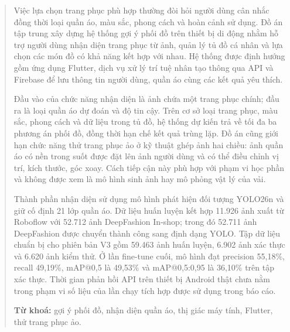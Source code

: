 \begin{abstract}

Việc lựa chọn trang phục phù hợp thường đòi hỏi người dùng cân nhắc đồng
thời loại quần áo, màu sắc, phong cách và hoàn cảnh sử dụng. Đồ án tập trung
xây dựng hệ thống gợi ý phối đồ trên thiết bị di động nhằm hỗ trợ người dùng
nhận diện trang phục từ ảnh, quản lý tủ đồ cá nhân và lựa chọn các món đồ có
khả năng kết hợp với nhau. Hệ thống được định hướng gồm ứng dụng Flutter,
dịch vụ xử lý trí tuệ nhân tạo thông qua API và Firebase để lưu thông tin
người dùng, quần áo cùng các kết quả yêu thích.

Đầu vào của chức năng nhận diện là ảnh chứa một trang phục chính; đầu ra là
loại quần áo dự đoán và độ tin cậy. Trên cơ sở loại trang phục, màu sắc,
phong cách và dữ liệu trong tủ đồ, hệ thống dự kiến trả về tối đa ba phương
án phối đồ, đồng thời hạn chế kết quả trùng lặp. Đồ án cũng giới hạn chức
năng thử trang phục ảo ở kỹ thuật ghép ảnh hai chiều: ảnh quần áo có nền
trong suốt được đặt lên ảnh người dùng và có thể điều chỉnh vị trí, kích
thước, góc xoay. Cách tiếp cận này phù hợp với phạm vi học phần và không
được xem là mô hình sinh ảnh hay mô phỏng vật lý của vải.

Thành phần nhận diện sử dụng mô hình phát hiện đối tượng YOLO26n và giữ cố
định 21 lớp quần áo. Dữ liệu huấn luyện kết hợp 11.926 ảnh xuất từ Roboflow
với 52.712 ảnh DeepFashion In-shop; trong đó 52.711 ảnh DeepFashion được
chuyển thành công sang định dạng YOLO. Tập dữ liệu chuẩn bị cho phiên bản V3
gồm 59.463 ảnh huấn luyện, 6.902 ảnh xác thực và 6.620 ảnh kiểm thử. Ở lần
fine-tune cuối, mô hình đạt precision 55,18\%, recall 49,19\%, mAP@0,5 là
49,53\% và mAP@0,5:0,95 là 36,10\% trên tập xác thực. Thời gian phản hồi API
trên thiết bị Android thật chưa nằm trong phạm vi số liệu của lần chạy tích
hợp được sử dụng trong báo cáo.

\vspace{0.8em}
\noindent\textbf{Từ khoá:} gợi ý phối đồ, nhận diện quần áo, thị giác máy
tính, Flutter, thử trang phục ảo.

\end{abstract}
